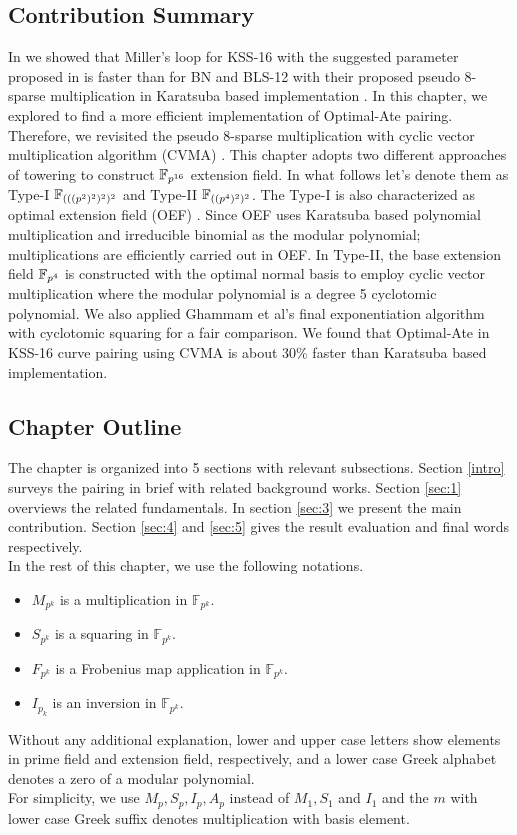 \subsection{Contribution Summary}
In \cite{INDOCRYPT:KNGDNK17} we showed that Miller's loop for KSS-16 with the suggested parameter proposed in \cite{EPRINT:BarDuq17} is faster than for BN and BLS-12 with their proposed pseudo 8-sparse multiplication in Karatsuba based implementation \cite{INDOCRYPT:KNGDNK17}.
In this chapter, we explored to find a more efficient implementation of Optimal-Ate pairing. 
Therefore, we revisited the pseudo 8-sparse multiplication with cyclic vector multiplication algorithm (CVMA) \cite{cvma_kato}.
This chapter adopts two different approaches of towering to construct $\mathbb{F}_{p^{16}}$ extension field. 
In what follows let's denote them as Type-I $\mathbb{F}_{(((p^2)^2)^2)^2}$ and Type-II  $\mathbb{F}_{((p^4)^2)^2}$.
The Type-I is also characterized as optimal extension field (OEF) \cite{JC:BaiPaa01}.
Since OEF uses Karatsuba based polynomial multiplication and irreducible binomial as the modular polynomial;  multiplications are efficiently carried out in OEF. 
In Type-II,  the base extension field $\mathbb{F}_{p^4}$ is constructed with the optimal normal basis to employ cyclic vector multiplication where the modular polynomial is a degree 5 cyclotomic polynomial.
We also applied Ghammam et al's \cite{EPRINT:GhaFou16b} final exponentiation algorithm with cyclotomic squaring \cite{DBLP:journals/moc/Karabina13} for a fair comparison.
We found that Optimal-Ate in KSS-16 curve pairing using CVMA is about 30\% faster than Karatsuba based implementation.

\subsection{Chapter Outline}
The chapter is organized into 5 sections with relevant subsections.
Section \ref{intro} surveys the pairing in brief with related background works.
Section \ref{sec:1} overviews the related fundamentals.
In section \ref{sec:3} we present the main contribution.
Section \ref{sec:4} and \ref{sec:5} gives the result evaluation and final words respectively. \\
In the rest of this chapter, we use the following notations.
 \begin{itemize}
   \item $M_{p^k}$ is a multiplication in  $\mathbb{F}_{p^{k}}$.
   \item $S_{p^k}$ is a squaring in  $\mathbb{F}_{p^{k}}$.
   \item $F_{p^k}$ is a Frobenius map application in  $\mathbb{F}_{p^{k}}$.
   \item $I_{p_k}$ is an inversion in  $\mathbb{F}_{p^{k}}$.
\end{itemize}
Without any additional explanation, lower and upper case letters show elements in prime field and extension field, respectively, and a lower case Greek alphabet denotes a zero of a modular polynomial.\\
For simplicity, we use $M_p, S_p, I_p, A_p$ instead of $M_1, S_1$ and $I_1$ and 
the $m$ with lower case Greek suffix denotes multiplication with basis element.

